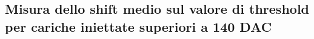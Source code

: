 \documentclass[10pt,a4paper,twoside]{report}
\begin{document}
\begin{comment}
Nel portare avanti le misure suddette, ci si è accorti di un problema nel circuito di iniezione che ne limita il range di funzionamento: l'altezza dell'impulso di iniezione infatti, cresce linearmente come aspettato fino ad un valore di $\approx$ 140 DAC, ma al al di sopra di questo valore, il circuito non solo aumenta di poco l'altezza del segnale, ma aumenta artificialmente anche il valore della threshold di un certo $\Delta V$ (o equivalentemente $\Delta Q$, collegati dal fattore di conversione in....).
Inoltre, per altezze dell'impulso di iniezione superiori a 200 DAC, solo il valore della threshold viene aumentato, senza però incrementare in alcun modo l'effettiva carica iniettata.

Per questa problematica, la caratterizzazione della threshold e della sua dispersione su tutti i flavor della matrice, ha richiesto una serie di misure ulteriori.
\end{comment}

\subsection{Misura dello shift medio sul valore di threshold per cariche iniettate superiori a 140 DAC}

\begin{comment}
Per poter valutare dunque questo shift artificiale sul valore della threshold, per ogni flavor della matrice abbiamo effettuato due misure della threshold e sua dispersione separate:

\begin{itemize}
\item per carica iniettata pari a 140 DAC $\rightarrow$ prima della regione di saturazione;
\item per carica iniettata pari a 200 DAC $\rightarrow$ limite massimo della ragione di saturazione (da questo valore in poi, aumenta solo la threshold, non la carica effettivamente iniettata).
\end{itemize}

Per ognuna di queste misure, è stata fittata la distribuzione della threshold per poter ottenere un valore medio sull'intero flavor, e chiamando $\Q_{th, 140}$ e $\Q_{th, 200}$  rispettivamente i valori di threshold ottenuti per iniezione a 140 e 200 DAC, è stato stimato lo shift medio come:

\begin{equation}
\Delta Q = Q_{th,200} - Q_{th,140}
\end{equation}

Infine, ai dati ottenuti per impulsi di iniezioni di 200 DAC, è stato sottratto questo valore di carica, per poter estrapolare fino a un valore di 170 DAC effettivo, il comportamento dei pixel iniettati.

Si riporta nelle sezioni successive quanto ottenuto per ciascun flavor della matrice, con il metodo utilizzato per poter stimare la threshold.

\end{comment}
\end{document}
